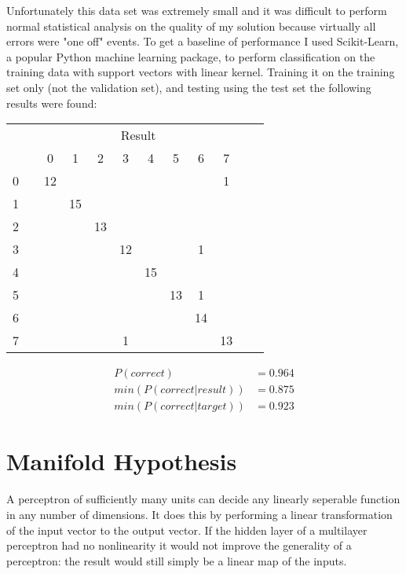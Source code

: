 \documentclass[10pt, conference, compsocconf]{IEEEtran}
\begin{document}
Unfortunately this data set was extremely small and it was difficult to perform normal statistical analysis on the quality of my solution because virtually all errors were "one off" events. To get a baseline of performance I used Scikit-Learn, a popular Python machine learning package, to perform classification on the training data with support vectors with linear kernel. Training it on the training set only (not the validation set), and testing using the test set the following results were found: 
\begin{center}
\begin{tabular}{l*{10}{c}r}
& & & & & \multicolumn{2}{c}{Result}  & & \\
 &\vline& 0 & 1 & 2 & 3 & 4 & 5 & 6 & 7 \\
\hline
0&\vline&  12&   &   &   &   &   &   &   1\\
1&\vline&   &  15&   &   &   &   &   &   \\
2&\vline&   &   &  13&   &   &   &   &   \\
3&\vline&   &   &   &  12&   &   &   1&   \\
4&\vline&   &   &   &   &  15&   &   &   \\
5&\vline&   &   &   &   &   &  13&   1&   \\
6&\vline&   &   &   &   &   &   &  14&   \\
7&\vline&   &   &   &   1&   &   &   &  13\\
\end{tabular}
\begin{align}P(correct) &= 0.964\\
min( P( correct | result ) ) &=  0.875\\
min( P( correct | target ) ) &=  0.923
\end{align}
\end{center}



\section{Manifold Hypothesis}
A perceptron of sufficiently many units can decide any linearly seperable function in any number of dimensions. It does this by performing a linear transformation of the input vector to the output vector. If the hidden layer of a multilayer perceptron had no nonlinearity it would not improve the generality of a perceptron: the result would still simply be a linear map of the inputs. 
\end{document}
